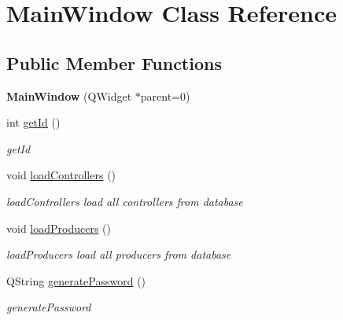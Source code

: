 \hypertarget{classMainWindow}{\section{Main\-Window Class Reference}
\label{classMainWindow}
}
\subsection*{Public Member Functions}
\begin{DoxyCompactItemize}
\item 
\hypertarget{classMainWindow_a8b244be8b7b7db1b08de2a2acb9409db}{{\bfseries Main\-Window} (Q\-Widget $\ast$parent=0)}\label{classMainWindow_a8b244be8b7b7db1b08de2a2acb9409db}

\item 
int \hyperlink{classMainWindow_a1584726c38b1ff0ec24d6c5b7a037fae}{get\-Id} ()
\begin{DoxyCompactList}\small\item\em get\-Id \end{DoxyCompactList}\item 
\hypertarget{classMainWindow_a1ca2a21f5ccff5795f7c43d949ca2e0a}{void \hyperlink{classMainWindow_a1ca2a21f5ccff5795f7c43d949ca2e0a}{load\-Controllers} ()}\label{classMainWindow_a1ca2a21f5ccff5795f7c43d949ca2e0a}

\begin{DoxyCompactList}\small\item\em load\-Controllers load all controllers from database \end{DoxyCompactList}\item 
\hypertarget{classMainWindow_abf02d40a156912ad924d1342d1e12a33}{void \hyperlink{classMainWindow_abf02d40a156912ad924d1342d1e12a33}{load\-Producers} ()}\label{classMainWindow_abf02d40a156912ad924d1342d1e12a33}

\begin{DoxyCompactList}\small\item\em load\-Producers load all producers from database \end{DoxyCompactList}\item 
Q\-String \hyperlink{classMainWindow_a59e026283ea2d28a840172b3d186e0c0}{generate\-Password} ()
\begin{DoxyCompactList}\small\item\em generate\-Password \end{DoxyCompactList}\end{DoxyCompactItemize}
